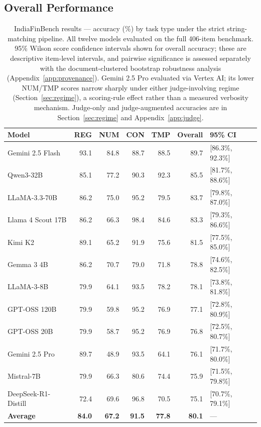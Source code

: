 
\subsection{Overall Performance}
\label{sec:main-results}
\label{sec:main-results-text}

\begin{table}[t]
\centering\small
\begin{tabular}{lrrrrrl}
\toprule
\textbf{Model} & \textbf{REG} & \textbf{NUM} & \textbf{CON} & \textbf{TMP} & \textbf{Overall} & \textbf{95\% CI} \\
\midrule
Gemini 2.5 Flash & 93.1 & 84.8 & 88.7 & 88.5 & 89.7 & [86.3\%, 92.3\%] \\
Qwen3-32B & 85.1 & 77.2 & 90.3 & 92.3 & 85.5 & [81.7\%, 88.6\%] \\
LLaMA-3.3-70B & 86.2 & 75.0 & 95.2 & 79.5 & 83.7 & [79.8\%, 87.0\%] \\
Llama 4 Scout 17B & 86.2 & 66.3 & 98.4 & 84.6 & 83.3 & [79.3\%, 86.6\%] \\
Kimi K2 & 89.1 & 65.2 & 91.9 & 75.6 & 81.5 & [77.5\%, 85.0\%] \\
Gemma 3 4B & 86.2 & 70.7 & 79.0 & 71.8 & 78.8 & [74.6\%, 82.5\%] \\
LLaMA-3-8B & 79.9 & 64.1 & 93.5 & 78.2 & 78.1 & [73.8\%, 81.8\%] \\
GPT-OSS 120B & 79.9 & 59.8 & 95.2 & 76.9 & 77.1 & [72.8\%, 80.9\%] \\
GPT-OSS 20B & 79.9 & 58.7 & 95.2 & 76.9 & 76.8 & [72.5\%, 80.7\%] \\
Gemini 2.5 Pro\textdagger{} & 89.7 & 48.9 & 93.5 & 64.1 & 76.1 & [71.7\%, 80.0\%] \\
Mistral-7B & 79.9 & 66.3 & 80.6 & 74.4 & 75.9 & [71.5\%, 79.8\%] \\
DeepSeek-R1-Distill & 72.4 & 69.6 & 96.8 & 70.5 & 75.1 & [70.7\%, 79.1\%] \\
\midrule
\textbf{Average} & \textbf{84.0} & \textbf{67.2} & \textbf{91.5} & \textbf{77.8} & \textbf{80.1} & --- \\
\bottomrule
\end{tabular}
\caption{IndiaFinBench results --- accuracy (\%) by task type under the strict string-matching
pipeline. All twelve models evaluated on the full 406-item benchmark. 95\% Wilson score
\citep{wilson1927} confidence intervals shown for overall accuracy; these are descriptive item-level
intervals, and pairwise significance is assessed separately with the document-clustered bootstrap
robustness analysis (Appendix~\ref{app:provenance}). \textdagger{}Gemini 2.5 Pro
evaluated via Vertex AI; its lower NUM/TMP scores narrow sharply under either judge-involving
regime (Section~\ref{sec:regime}), a scoring-rule effect rather than a measured verbosity
mechanism. Judge-only and judge-augmented accuracies are in Section~\ref{sec:regime} and
Appendix~\ref{app:judge}.}
\label{tab:mainresults}
\end{table}

